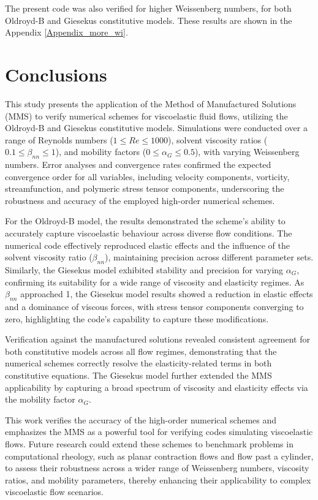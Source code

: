 \documentclass[preprint, 12pt]{elsarticle}
\begin{document}
The present code was also verified for higher Weissenberg numbers, for both Oldroyd-B and Giesekus constitutive models. These results are shown in the Appendix \ref{Appendix_more_wi}.


\section{Conclusions}\label{sec_Conclusions}

This study presents the application of the Method of Manufactured Solutions (MMS) to verify numerical schemes for viscoelastic fluid flows, utilizing the Oldroyd-B and Giesekus constitutive models. Simulations were conducted over a range of Reynolds numbers (\( 1 \leq Re \leq 1000 \)), solvent viscosity ratios (\( 0.1 \leq \beta_{nn} \leq 1 \)), and mobility factors (\( 0 \leq \alpha_G \leq 0.5 \)), with varying Weissenberg numbers. Error analyses and convergence rates confirmed the expected convergence order for all variables, including velocity components, vorticity, streamfunction, and polymeric stress tensor components, underscoring the robustness and accuracy of the employed high-order numerical schemes.

For the Oldroyd-B model, the results demonstrated the scheme's ability to accurately capture viscoelastic behaviour across diverse flow conditions. The numerical code effectively reproduced elastic effects and the influence of the solvent viscosity ratio (\( \beta_{nn} \)), maintaining precision across different parameter sets. Similarly, the Giesekus model exhibited stability and precision for varying \( \alpha_G \), confirming its suitability for a wide range of viscosity and elasticity regimes. As \( \beta_{nn} \) approached 1, the Giesekus model results showed a reduction in elastic effects and a dominance of viscous forces, with stress tensor components converging to zero, highlighting the code’s capability to capture these modifications.

Verification against the manufactured solutions revealed consistent agreement for both constitutive models across all flow regimes, demonstrating that the numerical schemes correctly resolve the elasticity-related terms in both constitutive equations. The Giesekus model further extended the MMS applicability by capturing a broad spectrum of viscosity and elasticity effects via the mobility factor \( \alpha_G \).

This work verifies the accuracy of the high-order numerical schemes and emphasizes the MMS as a powerful tool for verifying codes simulating viscoelastic flows. Future research could extend these schemes to benchmark problems in computational rheology, such as planar contraction flows and flow past a cylinder, to assess their robustness across a wider range of Weissenberg numbers, viscosity ratios, and mobility parameters, thereby enhancing their applicability to complex viscoelastic flow scenarios.
\end{document}
